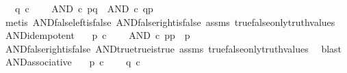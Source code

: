 \begin{isabellebody}
\ \ \ {\isachardoublequoteopen}q\ {\isasymin}\isactrlsub c\ {\isasymOmega}{\isachardoublequoteclose}\isanewline
\ \ \ {\isachardoublequoteopen}AND\ {\isasymcirc}\isactrlsub c\ {\isasymlangle}p{\isacharcomma}{\kern0pt}q{\isasymrangle}\ {\isacharequal}{\kern0pt}\ AND\ {\isasymcirc}\isactrlsub c\ {\isasymlangle}q{\isacharcomma}{\kern0pt}p{\isasymrangle}{\isachardoublequoteclose}\isanewline
%
\isadelimproof
\ \ %
\endisadelimproof
%
\isatagproof
{}\isamarkupfalse%
\ {\isacharparenleft}{\kern0pt}metis\ AND{\isacharunderscore}{\kern0pt}false{\isacharunderscore}{\kern0pt}left{\isacharunderscore}{\kern0pt}is{\isacharunderscore}{\kern0pt}false\ AND{\isacharunderscore}{\kern0pt}false{\isacharunderscore}{\kern0pt}right{\isacharunderscore}{\kern0pt}is{\isacharunderscore}{\kern0pt}false\ assms\ true{\isacharunderscore}{\kern0pt}false{\isacharunderscore}{\kern0pt}only{\isacharunderscore}{\kern0pt}truth{\isacharunderscore}{\kern0pt}values{\isacharparenright}{\kern0pt}%
\endisatagproof
{\isafoldproof}%
%
\isadelimproof
\isanewline
%
\endisadelimproof
\isanewline
{}\isamarkupfalse%
\ AND{\isacharunderscore}{\kern0pt}idempotent{\isacharcolon}{\kern0pt}\isanewline
\ \ \ {\isachardoublequoteopen}p\ {\isasymin}\isactrlsub c\ {\isasymOmega}{\isachardoublequoteclose}\isanewline
\ \ \ {\isachardoublequoteopen}AND\ {\isasymcirc}\isactrlsub c\ {\isasymlangle}p{\isacharcomma}{\kern0pt}p{\isasymrangle}\ {\isacharequal}{\kern0pt}\ p{\isachardoublequoteclose}\isanewline
%
\isadelimproof
\ \ %
\endisadelimproof
%
\isatagproof
{}\isamarkupfalse%
\ AND{\isacharunderscore}{\kern0pt}false{\isacharunderscore}{\kern0pt}right{\isacharunderscore}{\kern0pt}is{\isacharunderscore}{\kern0pt}false\ AND{\isacharunderscore}{\kern0pt}true{\isacharunderscore}{\kern0pt}true{\isacharunderscore}{\kern0pt}is{\isacharunderscore}{\kern0pt}true\ assms\ true{\isacharunderscore}{\kern0pt}false{\isacharunderscore}{\kern0pt}only{\isacharunderscore}{\kern0pt}truth{\isacharunderscore}{\kern0pt}values\ \isamarkupfalse%
\ blast%
\endisatagproof
{\isafoldproof}%
%
\isadelimproof
\isanewline
%
\endisadelimproof
\isanewline
{}\isamarkupfalse%
\ AND{\isacharunderscore}{\kern0pt}associative{\isacharcolon}{\kern0pt}\isanewline
\ \ \ {\isachardoublequoteopen}p\ {\isasymin}\isactrlsub c\ {\isasymOmega}{\isachardoublequoteclose}\isanewline
\ \ \ {\isachardoublequoteopen}q\ {\isasymin}\isactrlsub c\ {\isasymOmega}{\isachardoublequoteclose}\isanewline

\end{isabellebody}
